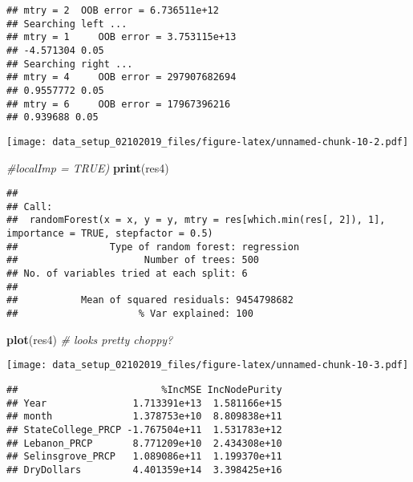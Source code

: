 \documentclass[]{article}
\newenvironment{Shaded}{\begin{snugshade}}{\end{snugshade}}
\newcommand{\KeywordTok}[1]{\textcolor[rgb]{0.13,0.29,0.53}{\textbf{{#1}}}}
\newcommand{\CommentTok}[1]{\textcolor[rgb]{0.56,0.35,0.01}{\textit{{#1}}}}
\newcommand{\NormalTok}[1]{{#1}}
\begin{document}
\begin{verbatim}
## mtry = 2  OOB error = 6.736511e+12 
## Searching left ...
## mtry = 1     OOB error = 3.753115e+13 
## -4.571304 0.05 
## Searching right ...
## mtry = 4     OOB error = 297907682694 
## 0.9557772 0.05 
## mtry = 6     OOB error = 17967396216 
## 0.939688 0.05
\end{verbatim}

\texttt{[image: data\_setup\_02102019\_files/figure-latex/unnamed-chunk-10-2.pdf]}

\begin{Shaded}
\begin{Highlighting}[]
              \CommentTok{#localImp = TRUE)}
\KeywordTok{print}\NormalTok{(res4)}
\end{Highlighting}
\end{Shaded}

\begin{verbatim}
## 
## Call:
##  randomForest(x = x, y = y, mtry = res[which.min(res[, 2]), 1],      importance = TRUE, stepfactor = 0.5) 
##                Type of random forest: regression
##                      Number of trees: 500
## No. of variables tried at each split: 6
## 
##           Mean of squared residuals: 9454798682
##                     % Var explained: 100
\end{verbatim}

\begin{Shaded}
\begin{Highlighting}[]
\KeywordTok{plot}\NormalTok{(res4)         }\CommentTok{# looks pretty choppy?}
\end{Highlighting}
\end{Shaded}

\texttt{[image: data\_setup\_02102019\_files/figure-latex/unnamed-chunk-10-3.pdf]}

\begin{Shaded}
\end{Shaded}

\begin{verbatim}
##                         %IncMSE IncNodePurity
## Year               1.713391e+13  1.581166e+15
## month              1.378753e+10  8.809838e+11
## StateCollege_PRCP -1.767504e+11  1.531783e+12
## Lebanon_PRCP       8.771209e+10  2.434308e+10
## Selinsgrove_PRCP   1.089086e+11  1.199370e+11
## DryDollars         4.401359e+14  3.398425e+16
\end{verbatim}
\end{document}
